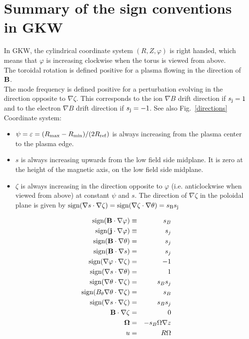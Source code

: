 \section{Summary of the sign conventions in GKW} 
\label{signsappendix}
In GKW, the cylindrical coordinate system $(R,Z,\varphi)$ is right handed, which means that $\varphi$ is increasing clockwise when the torus is viewed from above.\\
The toroidal rotation is defined positive for a plasma flowing in the direction of ${\bf B}$.\\
The mode frequency is defined positive for a perturbation evolving in the direction opposite to $\nabla \zeta$. This corresponds to the ion $\nabla B$ drift direction if $s_{\rm j}=1$ and to the
electron $\nabla B$ drift direction if $s_{\rm j}=-1$.  See also Fig.~\ref{directions}\\
Coordinate system:
\begin{itemize}
 \item $\psi=\varepsilon=(R_{\rm max}-R_{\rm min})/(2R_{\rm ref})$ is always increasing from the plasma center to the plasma edge.
 \item $s$ is always increasing upwards from the low field side midplane. It is zero at the height of the magnetic axis, on the low field side midplane.
 \item $\zeta$ is always increasing in the direction opposite to $\varphi$ (i.e. anticlockwise when viewed from above) at constant $\psi$ and $s$. The direction of $\nabla \zeta$ in the poloidal plane is
given by $\textrm{sign}(\nabla s \cdot \nabla \zeta)=\textrm{sign}(\nabla 
\zeta \cdot \nabla \theta)=s_{\rm B}s_{\rm j}$
\end{itemize}

\begin{align}
\textrm{sign}({\bf B} \cdot \nabla \varphi)&\equiv& s_B \\
\textrm{sign}({\bf j} \cdot \nabla \varphi)&\equiv&s_j \\
\textrm{sign}({\bf B} \cdot \nabla \theta)&=& s_j \\
\textrm{sign}({\bf B} \cdot \nabla s)&=& s_j \\
\textrm{sign}(\nabla \varphi \cdot \nabla \zeta)&=& -1 \\
\textrm{sign}(\nabla s \cdot \nabla \theta)&=& 1\\
\textrm{sign}(\nabla \theta \cdot \nabla \zeta)&=& s_B s_j \\
\textrm{sign}(B_\theta \nabla \theta \cdot \nabla \zeta)&=& s_B \\
\textrm{sign}(\nabla s \cdot \nabla \zeta)&=& s_B s_j \\
{\bf B} \cdot \nabla \zeta&=& 0 \\
{\bf \Omega} &=& -s_B \Omega \nabla z \\
u &=& R \Omega 
\end{align}

